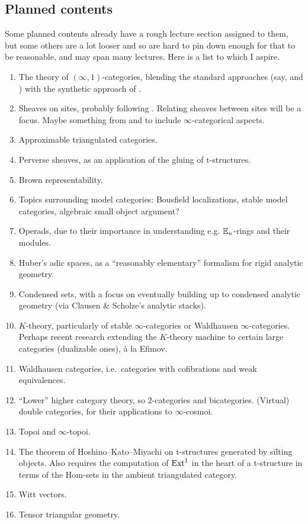 \documentclass[a4paper, 11pt]{article}
\newcommand{\1}{\ensuremath{\mathbb{1}}}
\newcommand{\2}{\ensuremath{\mathbb{2}}}
\newcommand{\3}{\ensuremath{\mathbb{3}}}
\begin{document}
\subsection{Planned contents}
Some planned contents already have a rough lecture section assigned to them, but some others are a lot looser and so are hard to pin down enough for that to be reasonable, and may span many lectures.
Here is a list to which I aspire.
\begin{enumerate}[label=(\arabic*)]
\item The theory of \((\infty,1)\)-categories, blending the standard approaches (say, \cite{lurie-htt} and \cite{cisinski-book}) with the synthetic approach of \cite{riehl-verity-elements}.
\item Sheaves on sites, probably following \cite{kashiwara-schapira-book}. Relating sheaves between sites will be a focus. Maybe something from \cite[§6.2.2]{lurie-htt} and \cite[§1.3.1]{lurie-sag}
to include \(\infty\)-categorical aspects.
\item Approximable triangulated categories.
\item Perverse sheaves, as an application of the gluing of t-structures.
\item Brown representability.
\item Topics surrounding model categories: Bousfield localizations, stable model categories, algebraic small object argument?
\item Operads, due to their importance in understanding e.g. \(\mathbb{E}_n\)-rings and their modules.
\item Huber's adic spaces, as a ``reasonably elementary'' formalism for rigid analytic geometry.
\item Condensed sets, with a focus on eventually building up to condensed analytic geometry (via Clausen \& Scholze's analytic stacks).
\item \(K\)-theory, particularly of stable \(\infty\)-categories or Waldhausen \(\infty\)-categories. Perhaps recent research extending the \(K\)-theory machine to certain large categories (dualizable ones), à la Efimov.
\item Waldhausen categories, i.e.\ categories with cofibrations and weak equivalences.
\item ``Lower'' higher category theory, so 2-categories and bicategories. (Virtual) double categories, for their applications to \(\infty\)-cosmoi.
\item Topoi and \(\infty\)-topoi.
\item The theorem of Hoshino--Kato--Miyachi on t-structures generated by silting objects. Also requires the computation of \(\operatorname{Ext}^1\) in the heart of a t-structure
in terms of the Hom-sets in the ambient triangulated category.
\item Witt vectors.
\item Tensor triangular geometry.
\end{enumerate}
\end{document}

